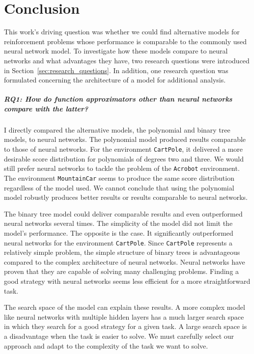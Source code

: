 
\chapter{Conclusion}
\label{ch:conclusions}

This work's driving question was whether we could find alternative models for reinforcement problems whose performance is comparable to the commonly used neural network model. To investigate how these models compare to neural networks and what advantages they have, two research questions were introduced in Section~\ref{sec:research_questions}. In addition, one research question was formulated concerning the architecture of a model for additional analysis.

\paragraph*{RQ1: How do function approximators other than neural networks compare with the latter?} I directly compared the alternative models, the polynomial and binary tree models, to neural networks. The polynomial model produced results comparable to those of neural networks. For the environment \verb|CartPole|, it delivered a more desirable score distribution for polynomials of degrees two and three. We would still prefer neural networks to tackle the problem of the \verb|Acrobot| environment. The environment \verb|MountainCar| seems to produce the same score distribution regardless of the model used. We cannot conclude that using the polynomial model robustly produces better results or results comparable to neural networks.

The binary tree model could deliver comparable results and even outperformed neural networks several times. The simplicity of the model did not limit the model's performance. The opposite is the case. It significantly outperformed neural networks for the environment \verb|CartPole|. Since \verb|CartPole| represents a relatively simple problem, the simple structure of binary trees is advantageous compared to the complex architecture of neural networks. Neural networks have proven that they are capable of solving many challenging problems. Finding a good strategy with neural networks seems less efficient for a more straightforward task.

The search space of the model can explain these results. A more complex model like neural networks with multiple hidden layers has a much larger search space in which they search for a good strategy for a given task. A large search space is a disadvantage when the task is easier to solve. We must carefully select our approach and adapt to the complexity of the task we want to solve.

